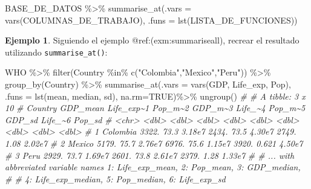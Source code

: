 \documentclass[
]{article}
\newenvironment{Shaded}{\begin{snugshade}}{\end{snugshade}}
\newcommand{\AttributeTok}[1]{\textcolor[rgb]{0.77,0.63,0.00}{#1}}
\newcommand{\CommentTok}[1]{\textcolor[rgb]{0.56,0.35,0.01}{\textit{#1}}}
\newcommand{\ConstantTok}[1]{\textcolor[rgb]{0.00,0.00,0.00}{#1}}
\newcommand{\FunctionTok}[1]{\textcolor[rgb]{0.00,0.00,0.00}{#1}}
\newcommand{\NormalTok}[1]{#1}
\newcommand{\SpecialCharTok}[1]{\textcolor[rgb]{0.00,0.00,0.00}{#1}}
\newcommand{\StringTok}[1]{\textcolor[rgb]{0.31,0.60,0.02}{#1}}
\theoremstyle{definition}
\theoremstyle{definition}
\newtheorem{example}{Ejemplo}[section]
\theoremstyle{definition}
\theoremstyle{definition}
\theoremstyle{remark}
\begin{document}
\begin{Shaded}
\begin{Highlighting}[]
\NormalTok{BASE\_DE\_DATOS }\SpecialCharTok{\%\textgreater{}\%} 
  \FunctionTok{summarise\_at}\NormalTok{(}\AttributeTok{.vars =} \FunctionTok{vars}\NormalTok{(COLUMNAS\_DE\_TRABAJO),}
               \AttributeTok{.funs =} \FunctionTok{lst}\NormalTok{(LISTA\_DE\_FUNCIONES))}
\end{Highlighting}
\end{Shaded}

\begin{example}

Siguiendo el ejemplo @ref:(exm:summariseall), recrear el resultado utilizando \texttt{summarise\_at()}:

\begin{Shaded}
\begin{Highlighting}[]
\NormalTok{WHO }\SpecialCharTok{\%\textgreater{}\%} 
  \FunctionTok{filter}\NormalTok{(Country }\SpecialCharTok{\%in\%} \FunctionTok{c}\NormalTok{(}\StringTok{"Colombia"}\NormalTok{,}\StringTok{"Mexico"}\NormalTok{,}\StringTok{"Peru"}\NormalTok{)) }\SpecialCharTok{\%\textgreater{}\%} 
  \FunctionTok{group\_by}\NormalTok{(Country) }\SpecialCharTok{\%\textgreater{}\%} 
  \FunctionTok{summarise\_at}\NormalTok{(}\AttributeTok{.vars =} \FunctionTok{vars}\NormalTok{(GDP, Life\_exp, Pop), }
               \AttributeTok{.funs =} \FunctionTok{lst}\NormalTok{(mean, median, sd),  }
               \AttributeTok{na.rm=}\ConstantTok{TRUE}\NormalTok{)}\SpecialCharTok{\%\textgreater{}\%} 
  \FunctionTok{ungroup}\NormalTok{()}
\CommentTok{\# \# A tibble: 3 x 10}
\CommentTok{\#   Country  GDP\_mean Life\_exp\textasciitilde{}1 Pop\_m\textasciitilde{}2 GDP\_m\textasciitilde{}3 Life\_\textasciitilde{}4 Pop\_m\textasciitilde{}5 GDP\_sd Life\_\textasciitilde{}6 Pop\_sd}
\CommentTok{\#   \textless{}chr\textgreater{}       \textless{}dbl\textgreater{}      \textless{}dbl\textgreater{}   \textless{}dbl\textgreater{}   \textless{}dbl\textgreater{}   \textless{}dbl\textgreater{}   \textless{}dbl\textgreater{}  \textless{}dbl\textgreater{}   \textless{}dbl\textgreater{}  \textless{}dbl\textgreater{}}
\CommentTok{\# 1 Colombia    3322.       73.3  3.18e7   2434.    73.5  4.30e7  2749.   1.08  2.02e7}
\CommentTok{\# 2 Mexico      5179.       75.7  2.76e7   6976.    75.6  1.15e7  3920.   0.621 4.50e7}
\CommentTok{\# 3 Peru        2929.       73.7  1.69e7   2601.    73.8  2.61e7  2379.   1.28  1.33e7}
\CommentTok{\# \# ... with abbreviated variable names 1: Life\_exp\_mean, 2: Pop\_mean, 3: GDP\_median,}
\CommentTok{\# \#   4: Life\_exp\_median, 5: Pop\_median, 6: Life\_exp\_sd}
\end{Highlighting}
\end{Shaded}

\end{example}
\end{document}
